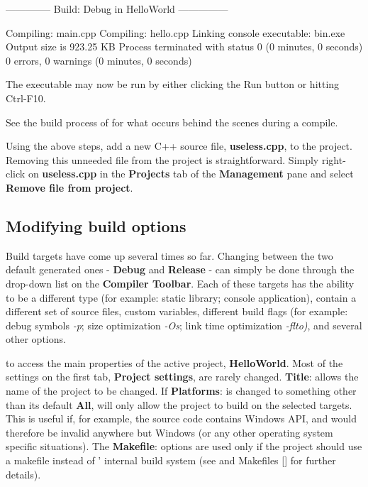 \begin{code}
-------------- Build: Debug in HelloWorld ---------------

Compiling: main.cpp
Compiling: hello.cpp
Linking console executable: bin\Debug\HelloWorld.exe
Output size is 923.25 KB
Process terminated with status 0 (0 minutes, 0 seconds)
0 errors, 0 warnings (0 minutes, 0 seconds)
\end{code}

The executable may now be run by either clicking the Run button or hitting Ctrl-F10.


See the build process of \codeblocks for what occurs behind the scenes during a compile.


Using the above steps, add a new C++ source file, \textbf{useless.cpp}, to the project. Removing this unneeded file from the project is straightforward. Simply right-click on \textbf{useless.cpp} in the \textbf{Projects} tab of the \textbf{Management} pane and select \textbf{Remove file from project}.

 


\subsection{Modifying build options}
 
Build targets have come up several times so far. Changing between the two default generated ones - \textbf{Debug} and \textbf{Release} - can simply be done through the drop-down list on the \textbf{Compiler Toolbar}. Each of these targets has the ability to be a different type (for example: static library; console application), contain a different set of source files, custom variables, different build flags (for example: debug symbols \textit{-p}; size optimization \textit{-Os}; link time optimization \textit{-flto)}, and several other options.
 
 
 to access the main properties of the active project, \textbf{HelloWorld}. Most of the settings on the first tab, \textbf{Project settings}, are rarely changed. \textbf{Title}: allows the name of the project to be changed. If \textbf{Platforms}: is changed to something other than its default \textbf{All}, \codeblocks will only allow the project to build on the selected targets. This is useful if, for example, the source code contains Windows API, and would therefore be invalid anywhere but Windows (or any other operating system specific situations). The \textbf{Makefile}: options are used only if the project should use a makefile instead of \codeblocks' internal build system (see \codeblocks and Makefiles [] for further details).

